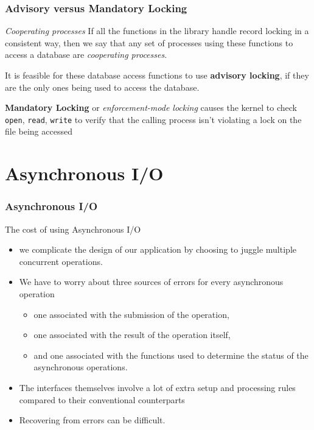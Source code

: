\documentclass[newPxFont,sthlmFooter,nooffset]{beamer}
\begin{document}
\begin{frame}[t]
  \frametitle{Advisory versus Mandatory Locking}
  \begin{block}{\textit{Cooperating processes}}
    If all the functions in the library handle record locking in a consistent way, then we say that any set of processes using these functions to access a database are \textit{cooperating processes}.
  \end{block}

It is feasible for these database access functions to use \textbf{advisory locking}, 
 if they are the only ones being used to access the database.
\bigskip

\textbf{Mandatory Locking} or \textit{enforcement-mode locking} causes the kernel to check \texttt{open}, \texttt{read}, \texttt{write} to verify that the calling process isn't violating a lock on the file being accessed
  

\end{frame}


\section{Asynchronous I/O}

\begin{frame}[t]
  \frametitle{Asynchronous I/O}
The cost of using Asynchronous I/O
\begin{itemize}
\item we complicate the design of our application by choosing to
  juggle multiple concurrent operations.
\item We have to worry about three sources of errors for every asynchronous operation
  \begin{itemize}
  \item one associated with the submission of the operation,
  \item one associated with the result of the operation itself,
  \item and one associated with the functions used to determine the
    status of the asynchronous operations.
  \end{itemize}
\item The interfaces themselves involve a lot of extra setup and processing rules compared to their conventional counterparts
\item Recovering from errors can be difficult.
\end{itemize}
  
\end{frame}
\end{document}
